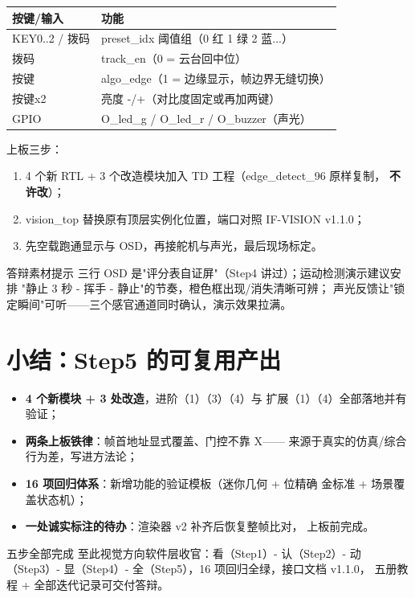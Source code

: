 \begin{center}
\begin{tabular}{ll}
\toprule
\rowcolor{rowtint}\textbf{按键/输入} & \textbf{功能} \\
\midrule
KEY0..2 / 拨码 & preset\_idx 阈值组（0 红 1 绿 2 蓝...） \\
拨码 & track\_en（0 = 云台回中位） \\
按键 & algo\_edge（1 = 边缘显示，帧边界无缝切换） \\
按键x2 & 亮度 -/+（对比度固定或再加两键） \\
GPIO & O\_led\_g / O\_led\_r / O\_buzzer（声光） \\
\bottomrule
\end{tabular}
\end{center}

上板三步：
\begin{enumerate}
  \item 4 个新 RTL + 3 个改造模块加入 TD 工程（edge\_detect\_96 原样复制，
    \textbf{不许改}）；
  \item vision\_top 替换原有顶层实例化位置，端口对照 IF-VISION v1.1.0；
  \item 先空载跑通显示与 OSD，再接舵机与声光，最后现场标定。
\end{enumerate}

\begin{tipbox}{答辩素材提示}
三行 OSD 是"评分表自证屏"（Step4 讲过）；运动检测演示建议安排
"静止 3 秒 - 挥手 - 静止"的节奏，橙色框出现/消失清晰可辨；
声光反馈让"锁定瞬间"可听——三个感官通道同时确认，演示效果拉满。
\end{tipbox}

\section{小结：Step5 的可复用产出}

\begin{itemize}
  \item \textbf{4 个新模块 + 3 处改造}，进阶（1）（3）（4）与
    扩展（1）（4）全部落地并有验证；
  \item \textbf{两条上板铁律}：帧首地址显式覆盖、门控不靠 X——
    来源于真实的仿真/综合行为差，写进方法论；
  \item \textbf{16 项回归体系}：新增功能的验证模板（迷你几何 + 位精确
    金标准 + 场景覆盖状态机）；
  \item \textbf{一处诚实标注的待办}：渲染器 v2 补齐后恢复整帧比对，
    上板前完成。
\end{itemize}

\begin{okbox}{五步全部完成}
至此视觉方向软件层收官：看（Step1）- 认（Step2）- 动（Step3）-
显（Step4）- 全（Step5），16 项回归全绿，接口文档 v1.1.0，
五册教程 + 全部迭代记录可交付答辩。
\end{okbox}
